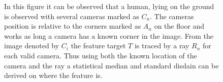 \def\svgwidth{\columnwidth}
\begin{figure}[ht]
    \centering
           
           \caption[3D human on ground]{
               In this figure it can be observed that a human, lying on the ground is observed with several cameras marked as $C_n$.
               The cameras position is relative to the \aruco corners marked as $A_n$ on the floor and works as long a camera has a known \aruco corner in the image.
               From the image denoted by
               $C_i$
               the feature target $T$ is traced by a ray $R_n$ for each valid camera.
               Thus using both the known location of the camera and the ray a statistical median and standard disdain can be derived on where the feature is.
           }
    \label{fig:3Dhuman}
\end{figure}







